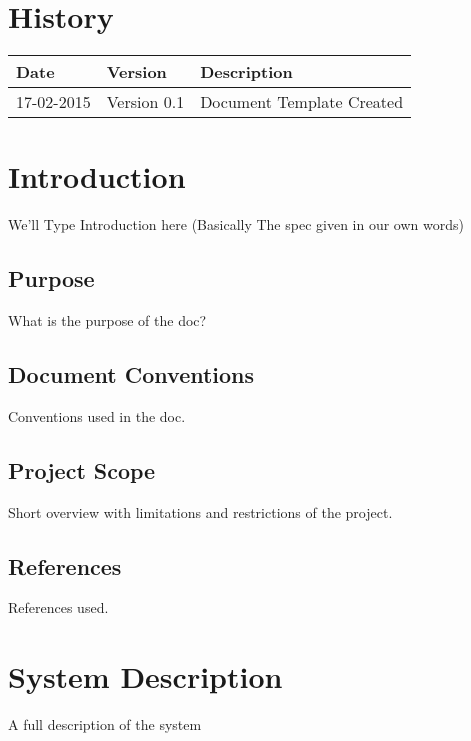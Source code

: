 \documentclass[12pt]{article}
\begin{document}


\section{History}
\begin{tabular}{|l|l|l|}

\hline
Date & Version & Description\\ %
\hline
17-02-2015 & Version 0.1 & Document Template Created\\ %

\end{tabular}

\newpage
\tableofcontents

\newpage

\section{Introduction}
We'll Type Introduction here (Basically The spec given in our own words)

\subsection{Purpose}
What is the purpose of the doc?	

\subsection{Document Conventions}
Conventions used in the doc.

\subsection{Project Scope}
Short overview with limitations and restrictions of the project.

\subsection{References}
References used.

\section{System Description}
A full description of the system
\end{document}
